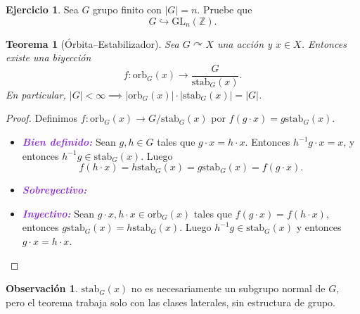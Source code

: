 \documentclass{article}
\newtheorem{theorem}{Teorema}[subsection]
\theoremstyle{definition}
\newtheorem{exercise}{Ejercicio}
\newtheorem*{obs}{Observación}
\theoremstyle{remark}
\numberwithin{equation}{section}
\newcommand{\Z}{\mathbb{Z}}
\newcommand{\oo}{\infty}
\newcommand{\embed}{\hookrightarrow}
\newcommand{\acts}{\curvearrowright}
\renewcommand{\c}{\cdot}
\newcommand{\orb}{\mathrm{orb}}
\newcommand{\GL}{\mathrm{GL}}
\newcommand{\Sym}{\mathrm{Sym}}
\newcommand{\stab}{\mathrm{stab}}
\newcommand{\abs}[1]{\left| #1 \right|}
\newcommand{\wea}[1]{\textcolor{BlueViolet}{\textbf{\emph{#1}}}}
\begin{document}
\begin{exercise}
  Sea $G$ grupo finito con $\abs G = n$. Pruebe que $$G \embed \GL_n(\Z).$$
\end{exercise}

\begin{theorem}
  [Órbita--Estabilizador]
  Sea $G \acts X$ una acción y $x \in X$. Entonces existe una biyección
  \[f \colon \orb_G(x) \to \frac{G}{\stab_G(x)}.\]
  En particular, $\abs G < \oo \implies \abs{\orb_G(x)} \c \abs{\stab_G(x)} = \abs{G}$.
\end{theorem}
\begin{proof}
  Definimos $f \colon \orb_G(x) \to G/\stab_G(x)$ por $f(g \c x) = g \stab_G(x)$.
  \begin{itemize}
    \item \wea{Bien definido: }
    Sean $g,h \in G$ tales que $g \c x = h \c x$. Entonces $h^{-1} g \c x = x$, y entonces $h^{-1}g \in \stab_G(x)$. Luego $$f(h \c x) = h \stab_G(x) = g \stab_G(x) = f(g \c x).$$

    \item \wea{Sobreyectivo: } \checkmark %
    \item \wea{ Inyectivo: }
    Sean $g\c x, h \c x \in \orb_G(x)$ tales que $f(g \c x) = f(h \c x)$, entonces $g \stab_G(x) = h \stab_G(x)$. Luego $h^{-1} g \in \stab_G(x)$ y entonces $g\c x = h \c x$.
  \end{itemize}
\end{proof} %

\begin{obs}
  $\stab_G(x)$ no es necesariamente un subgrupo normal de $G$, pero el teorema trabaja solo con las clases laterales, sin estructura de grupo.
\end{obs}
\end{document}
